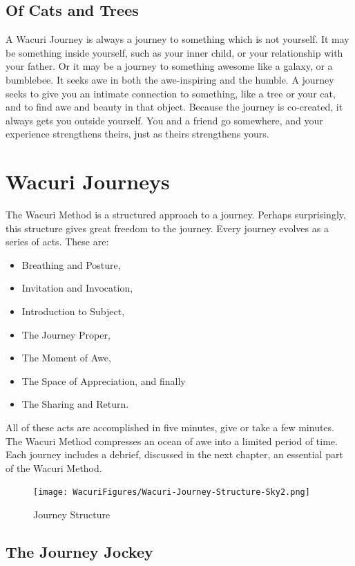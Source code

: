\documentclass[12pt]{book}
\begin{document}
\section{Of Cats and Trees}

A Wacuri Journey is always a journey to something which is not yourself. It may be something inside yourself, such as your inner child, or your relationship with your father. Or it may be a journey to something awesome like a galaxy, or a bumblebee. It seeks awe in both the awe-inspiring and the humble. A journey seeks to give you an intimate connection to something, like a tree or your cat, and to find awe and beauty in that object. Because the journey is co-created, it always gets you outside yourself. You and a friend go somewhere, and your experience strengthens theirs, just as theirs strengthens yours.
				



\chapter{Wacuri Journeys}

The Wacuri Method is a structured approach to a journey. Perhaps
surprisingly, this structure gives great freedom to the journey.
Every journey evolves as a series of acts.
These are:
\begin{itemize}
\item Breathing and Posture,
\item Invitation and Invocation,
\item Introduction to Subject,
\item The Journey Proper,
\item The Moment of Awe,
\item The Space of Appreciation, and finally
  \item The Sharing and Return.
\end{itemize}

All of these acts are accomplished in five minutes, give or take a few minutes. The Wacuri Method compresses an ocean of awe into a limited period of time. Each journey includes a debrief, discussed in the next chapter, an essential part of the Wacuri Method.


\begin{figure}
  \centering
     \texttt{[image: WacuriFigures/Wacuri-Journey-Structure-Sky2.png]}
     \caption{Journey Structure}
  \label{fig:journey}     
\end{figure}


\section{The Journey Jockey}
\end{document}
